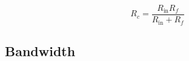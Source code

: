 \cite[p.~57]{Jung05}
\cite[p.~25]{Graeme96}

\begin{equation}
	R_c=\frac{R_\text{in}R_f}{R_\text{in}+R_f}
\end{equation}




\subsection{Bandwidth}

